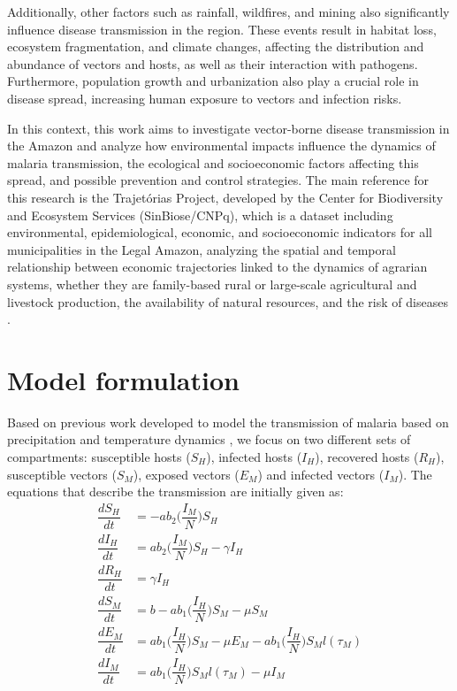 \documentclass[a4paper,fleqn]{cas-dc}
\begin{document}
Additionally, other factors such as rainfall, wildfires, and mining 
also significantly influence disease transmission in the region. These 
events result in habitat loss, ecosystem fragmentation, and climate 
changes, affecting the distribution and abundance of vectors and hosts, 
as well as their interaction with pathogens. Furthermore, population growth 
and urbanization also play a crucial role in disease spread, increasing 
human exposure to vectors and infection risks.

In this context, this work aims to investigate vector-borne disease 
transmission in the Amazon and analyze how environmental impacts 
influence the dynamics of malaria transmission, the ecological and 
socioeconomic factors affecting this spread, and possible prevention 
and control strategies. The main reference for this research is the 
Trajetórias Project, developed by the Center for Biodiversity and 
Ecosystem Services (SinBiose/CNPq), which is a dataset including 
environmental, epidemiological, economic, and socioeconomic indicators 
for all municipalities in the Legal Amazon, analyzing the spatial and 
temporal relationship between economic trajectories linked to the dynamics 
of agrarian systems, whether they are family-based rural or large-scale 
agricultural and livestock production, the availability of natural resources, 
and the risk of diseases \cite{Rorato2023}.

\section{Model formulation}

Based on previous work developed to model the transmission of malaria based on precipitation and temperature dynamics \cite{Parham2010}, we focus on two different sets of compartments: susceptible hosts ($S_H$), infected hosts ($I_H$), recovered hosts ($R_H$), susceptible vectors ($S_M$), exposed vectors ($E_M$) and infected vectors ($I_M$). The equations that describe the transmission are initially given as:
\begin{align}
\dfrac{dS_H}{dt} & = -ab_2\bigg(\dfrac{I_M}{N}\bigg)S_H \label{eq1}\\
\dfrac{dI_H}{dt} & = ab_2\bigg(\dfrac{I_M}{N}\bigg)S_H - \gamma I_H \label{eq2}\\
\dfrac{dR_H}{dt} & = \gamma I_H \label{eq3}\\
\dfrac{dS_M}{dt} & = b - ab_1\bigg(\dfrac{I_H}{N}\bigg)S_M - \mu S_M \label{eq4}\\
\dfrac{dE_M}{dt} & = ab_1\bigg(\dfrac{I_H}{N}\bigg)S_M - \mu E_M - ab_1\bigg(\dfrac{I_H}{N}\bigg)S_Ml(\tau_M) \label{eq5}\\
\dfrac{dI_M}{dt} & = ab_1\bigg(\dfrac{I_H}{N}\bigg)S_Ml(\tau_M) - \mu I_M \label{eq6}
\end{align}
\end{document}
